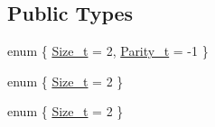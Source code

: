 \subsection*{Public Types}
\begin{DoxyCompactItemize}
\item 
enum \{ \mbox{\hyperlink{structHadron_1_1G1uRep_a94af5a61531cd87bfcc54e46d848ef64abf1e4b770795e8da7f7f8752d09ddc41}{Size\+\_\+t}} = 2, 
\mbox{\hyperlink{structHadron_1_1G1uRep_a0e2593dac3ca66b722dd7d12b93b8bd4a27c56b94a9011ca40455eca04fb2b0b1}{Parity\+\_\+t}} = -\/1
 \}
\item 
enum \{ \mbox{\hyperlink{structHadron_1_1G1uRep_a94af5a61531cd87bfcc54e46d848ef64abf1e4b770795e8da7f7f8752d09ddc41}{Size\+\_\+t}} = 2
 \}
\item 
enum \{ \mbox{\hyperlink{structHadron_1_1G1uRep_a94af5a61531cd87bfcc54e46d848ef64abf1e4b770795e8da7f7f8752d09ddc41}{Size\+\_\+t}} = 2
 \}
\end{DoxyCompactItemize}
